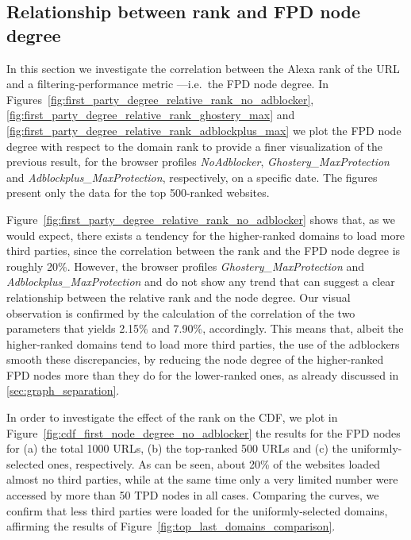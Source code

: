 \subsection{Relationship between rank and FPD node degree}
In this section we investigate the correlation between the Alexa rank of the URL and a filtering-performance metric ---i.e.\ the FPD node degree. In Figures~\ref{fig:first_party_degree_relative_rank_no_adblocker}, \ref{fig:first_party_degree_relative_rank_ghostery_max} and \ref{fig:first_party_degree_relative_rank_adblockplus_max} we plot the FPD node degree with respect to the domain rank to provide a finer visualization of the previous result, for the browser profiles \textit{NoAdblocker}, \textit{Ghostery\_\allowbreak MaxProtection} and \textit{Adblockplus\_\allowbreak MaxProtection}, respectively, on a specific date. The figures present only the data for the top 500-ranked websites.

Figure~\ref{fig:first_party_degree_relative_rank_no_adblocker} shows that, as we would expect, there exists a tendency for the higher-ranked domains to load more third parties, since the correlation between the rank and the FPD node degree is roughly 20\%. However, the browser profiles \textit{Ghostery\_\allowbreak MaxProtection} and \textit{Adblockplus\_\allowbreak MaxProtection} and do not show any trend that can suggest a clear relationship between the relative rank and the node degree. Our visual observation is confirmed by the calculation of the correlation of the two parameters that yields 2.15\% and 7.90\%, accordingly. This means that, albeit the higher-ranked domains tend to load more third parties, the use of the adblockers smooth these discrepancies, by reducing the node degree of the higher-ranked FPD nodes more than they do for the lower-ranked ones, as already discussed in \ref{sec:graph_separation}.

In order to investigate the effect of the rank on the CDF, we plot in Figure~\ref{fig:cdf_first_node_degree_no_adblocker} the results for the FPD nodes for (a) the total 1000 URLs, (b) the top-ranked 500 URLs and (c) the uniformly-selected ones, respectively. As can be seen, about 20\% of the websites loaded almost no third parties, while at the same time only a very limited number were accessed by more than 50 TPD nodes in all cases. Comparing the curves, we confirm that less third parties were loaded for the uniformly-selected domains, affirming the results of Figure~\ref{fig:top_last_domains_comparison}.

